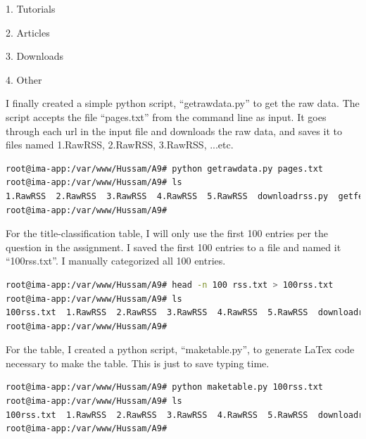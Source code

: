 \documentclass[a4paper, 11pt]{article}
\begin{document}
1. Tutorials

2. Articles

3. Downloads

4. Other

I finally created a simple python script, ``getrawdata.py'' to get the raw data. The script accepts the file ``pages.txt'' from the command line as input. It goes through each url in the input file and downloads the raw data, and saves it to files named 1.RawRSS, 2.RawRSS, 3.RawRSS, ...etc.



\begin{lstlisting}[language=bash, breakatwhitespace=〈false), label=Running getrawdata.py, caption= Running getrawdata.py]
root@ima-app:/var/www/Hussam/A9# python getrawdata.py pages.txt
root@ima-app:/var/www/Hussam/A9# ls
1.RawRSS  2.RawRSS  3.RawRSS  4.RawRSS  5.RawRSS  downloadrss.py  getfeed.py  getrawdata.py  pages.txt  rss.txt
root@ima-app:/var/www/Hussam/A9#
\end{lstlisting}

For the title-classification table, I will only use the first 100 entries per the question in the assignment. I saved the first 100 entries to a file and named it ``100rss.txt''. I manually categorized all 100 entries.
\begin{lstlisting}[language=bash]
root@ima-app:/var/www/Hussam/A9# head -n 100 rss.txt > 100rss.txt
root@ima-app:/var/www/Hussam/A9# ls
100rss.txt  1.RawRSS  2.RawRSS  3.RawRSS  4.RawRSS  5.RawRSS  downloadrss.py  getfeed.py  getrawdata.py  pages.txt  rss.txt
root@ima-app:/var/www/Hussam/A9#
\end{lstlisting}

For the table, I created a python script, ``maketable.py'', to generate LaTex code necessary to make the table. This is just to save typing time.



\begin{lstlisting}[language=bash, breakatwhitespace=〈false), label=Running maketable.py, caption= Running maketable.py]
root@ima-app:/var/www/Hussam/A9# python maketable.py 100rss.txt
root@ima-app:/var/www/Hussam/A9# ls
100rss.txt  1.RawRSS  2.RawRSS  3.RawRSS  4.RawRSS  5.RawRSS  downloadrss.py  getfeed.py  getrawdata.py  maketable.py  pages.txt  rss.txt  tex.table
root@ima-app:/var/www/Hussam/A9#
\end{lstlisting}
\end{document}
